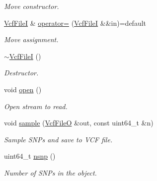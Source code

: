 \begin{DoxyCompactItemize}
\begin{DoxyCompactList}\small\item\em Move constructor. \end{DoxyCompactList}\item 
\mbox{\label{classsamp_files_1_1_vcf_file_i_a176773eed34f95061bcb254cfada231c}} 
\hyperlink{classsamp_files_1_1_vcf_file_i}{Vcf\+FileI} \& \hyperlink{classsamp_files_1_1_vcf_file_i_a176773eed34f95061bcb254cfada231c}{operator=} (\hyperlink{classsamp_files_1_1_vcf_file_i}{Vcf\+FileI} \&\&in)=default
\begin{DoxyCompactList}\small\item\em Move assignment. \end{DoxyCompactList}\item 
\mbox{\label{classsamp_files_1_1_vcf_file_i_a413fcb2f9d9b959546a3fac8226ce239}} 
\hyperlink{classsamp_files_1_1_vcf_file_i_a413fcb2f9d9b959546a3fac8226ce239}{$\sim$\+Vcf\+FileI} ()
\begin{DoxyCompactList}\small\item\em Destructor. \end{DoxyCompactList}\item 
\mbox{\label{classsamp_files_1_1_vcf_file_i_a9e8cbc1c8cbd01d656df2ccd8c5293b0}} 
void \hyperlink{classsamp_files_1_1_vcf_file_i_a9e8cbc1c8cbd01d656df2ccd8c5293b0}{open} ()
\begin{DoxyCompactList}\small\item\em Open stream to read. \end{DoxyCompactList}\item 
void \hyperlink{classsamp_files_1_1_vcf_file_i_a1f8fcdba2d343654b3c9492a3dd80e93}{sample} (\hyperlink{classsamp_files_1_1_vcf_file_o}{Vcf\+FileO} \&out, const uint64\+\_\+t \&n)
\begin{DoxyCompactList}\small\item\em Sample S\+N\+Ps and save to V\+CF file. \end{DoxyCompactList}\item 
\mbox{\label{classsamp_files_1_1_vcf_file_i_a0a344d8392bfdff30dcf02ee63385ab0}} 
uint64\+\_\+t \hyperlink{classsamp_files_1_1_vcf_file_i_a0a344d8392bfdff30dcf02ee63385ab0}{nsnp} ()
\begin{DoxyCompactList}\small\item\em Number of S\+N\+Ps in the object. \end{DoxyCompactList}\end{DoxyCompactItemize}
